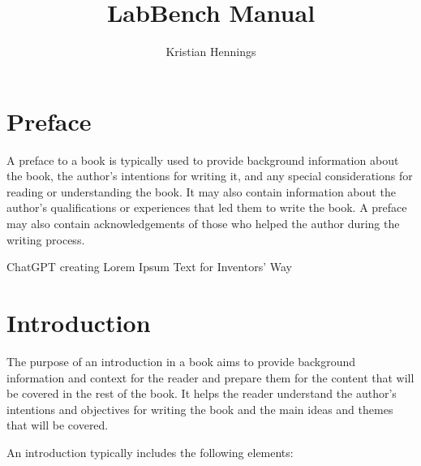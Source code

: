 \documentclass[12pt, twoside, a4paper]{book}
\begin{document}
\title{LabBench Manual}
\author{Kristian Hennings}

\frontmatter
\maketitle

\tableofcontents

\chapter*{Preface}

A preface to a book is typically used to provide background information about the book, the author's intentions for writing it, and any special considerations for reading or understanding the book. It may also contain information about the author's qualifications or experiences that led them to write the book. A preface may also contain acknowledgements of those who helped the author during the writing process.

ChatGPT creating Lorem Ipsum Text for Inventors' Way

\mainmatter

\chapter{Introduction}

The purpose of an introduction in a book aims to provide background information and context for the reader and prepare them for the content that will be covered in the rest of the book. It helps the reader understand the author's intentions and objectives for writing the book and the main ideas and themes that will be covered.

An introduction typically includes the following elements:
\end{document}

